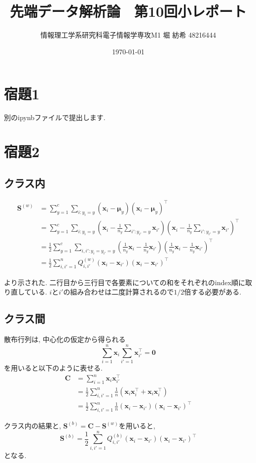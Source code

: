 \documentclass[a4paper,11pt]{jsarticle}
\begin{document}
  \title{先端データ解析論　第10回小レポート}
  \author{情報理工学系研究科電子情報学専攻M1 堀 紡希 48216444}
  \date{\today}
  \maketitle
  \section*{宿題1}
  別のipynbファイルで提出します.

  \section*{宿題2}
  \subsection*{クラス内}
  \begin{align*}
    {\bm S}^{(w)} &= \sum _{y=1}^c \sum _{i:y_i=y} ({\bm x}_i -{\bm \mu}_y)({\bm x}_i -{\bm \mu}_y)^\top\\
    &= \sum _{y=1}^c \sum _{i:y_i=y} ({\bm x}_i -\frac{1}{n_y}\sum _{i':y_{i'}=y} {\bm x}_{i'})({\bm x}_i -\frac{1}{n_y}\sum _{i':y_{i'}=y} {\bm x}_{i'})^\top\\
    &= \frac{1}{2}\sum _{y=1}^c \sum _{i, i': y_i=y_{i'}=y}(\frac{1}{n_y}{\bm x}_i - \frac{1}{n_y}{\bm x}_{i'})(\frac{1}{n_y}{\bm x}_i - \frac{1}{n_y}{\bm x}_{i'})^\top\\
    &= \frac{1}{2} \sum _{i,i'=1}^n Q_{i, i'}^{(w)}({\bm x}_i -{\bm x}_{i'})({\bm x}_i -{\bm x}_{i'})^\top
  \end{align*}

  より示された. 二行目から三行目で各要素についての和をそれぞれのindex順に取り直している.
  $i$と$i'$の組み合わせは二度計算されるので$1/2$倍する必要がある.
  \subsection*{クラス間}
  散布行列は, 中心化の仮定から得られる
  \[ \sum _{i=1} ^n {\bm x}_i\sum _{i'=1}^n{\bm x}_{i'}^\top = {\bm 0}\]
  を用いると以下のように表せる.
  \begin{align*}
    {\bm C} &= \sum _{i=1}^n {\bm x}_i{\bm x}_{i'}^\top\\
    &= \frac{1}{2} \sum _{i,i'=1}^n \frac{1}{n}({\bm x}_{i}{\bm x}_{i}^\top + {\bm x}_{i}{\bm x}_{i}^\top)\\
    &= \frac{1}{2} \sum _{i,i'=1}^n \frac{1}{n}({\bm x}_i - {\bm x}_{i'})({\bm x}_i - {\bm x}_{i'})^\top
  \end{align*}

  クラス内の結果と, ${\bm S}^{(b)} = {\bm C} - {\bm S}^{(w)}$を用いると, 
  \begin{equation*}
    {\bm S}^{(b)} = \frac{1}{2}\sum _{i,i'=1}^n Q_{i, i'}^{(b)} ({\bm x}_i-{\bm x}_{i'})({\bm x}_i-{\bm x}_{i'})^\top
  \end{equation*}
  となる.
\end{document}
